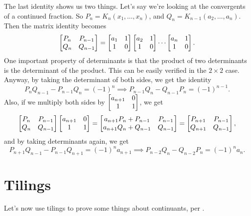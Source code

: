 \documentclass[11pt,paper=letter]{scrartcl}
\begin{document}
The last identity shows us two things. Let's say we're looking at the convergents of a continued fraction. So $P_n = K_n(x_1, \ldots, x_n)$, and $Q_n = K_{n-1}(a_2, \ldots, a_n)$. Then the matrix identity becomes \[
\begin{bmatrix}
  P_n & P_{n-1} \\ Q_n & Q_{n-1}
\end{bmatrix} = \begin{bmatrix}a_1 & 1 \\ 1 & 0\end{bmatrix}\begin{bmatrix}a_2 & 1 \\ 1 & 0\end{bmatrix}\cdots\begin{bmatrix}a_n & 1 \\ 1 & 0\end{bmatrix}.
\]
One important property of determinants is that the product of two determinants is the determinant of the product. This can be easily verified in the $2 \times 2$ case. Anyway, by taking the determinant of both sides, we get the identity \[
  P_nQ_{n-1} - P_{n-1}Q_n = (-1)^n \implies
  P_{n-1}Q_n - Q_{n-1}P_n = (-1)^{n-1}.
\]
Also, if we multiply both sides by $\begin{bmatrix}a_{n+1} & 0 \\ 1 & 1\end{bmatrix}$, we get \[
\begin{bmatrix}
  P_n & P_{n-1} \\ Q_n & Q_{n-1}
\end{bmatrix}\begin{bmatrix}a_{n+1} & 0 \\ 1 & 1\end{bmatrix} = \begin{bmatrix}
  a_{n+1}P_n + P_{n-1} & P_{n-1} \\
  a_{n+1}Q_n + Q_{n-1} & Q_{n-1}
\end{bmatrix} = \begin{bmatrix}
  P_{n+1} & P_{n-1} \\
  Q_{n+1} & Q_{n-1}
\end{bmatrix},
\]
and by taking determinants again, we get \[
  P_{n+1}Q_{n-1} - P_{n-1}Q_{n+1} = (-1)^n a_{n+1} \implies
  P_{n-2}Q_n - Q_{n-2}P_n = (-1)^n a_n.
\]

\section{Tilings}

Let's now use tilings to prove some things about continuants, per \cite{benjamin1}.
\end{document}
